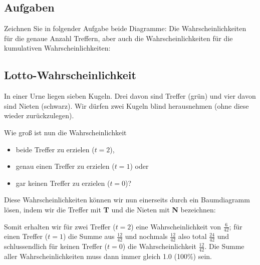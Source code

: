 \subsection*{Aufgaben}





Zeichnen Sie in folgender Aufgabe beide Diagramme: Die
Wahrscheinlichkeiten für die genaue Anzahl Treffern, aber auch die
Wahrscheinlichkeiten für die kumulativen Wahrscheinlichkeiten:


\newpage

\subsection{Lotto-Wahrscheinlichkeit}
In einer Urne liegen sieben Kugeln. Drei davon sind Treffer (grün) und vier davon sind Nieten (schwarz).
Wir dürfen zwei Kugeln blind herausnehmen (ohne diese wieder zurückzulegen).


Wie groß ist nun die Wahrscheinlichkeit
\begin{itemize}
\item beide Treffer zu erzielen ($t=2$),
\item genau einen Treffer zu erzielen ($t=1$) oder
\item gar keinen Treffer zu erzielen ($t=0$)?
\end{itemize}

Diese Wahrscheinlichkeiten können wir nun einerseits durch ein Baumdiagramm lösen, indem wir die Treffer mit \textbf{\color{ForestGreen}T} und die Nieten mit \textbf{\color{red}N} bezeichnen:


Somit erhalten wir für zwei Treffer ($t=2$) eine Wahrscheinlichkeit von $\frac{6}{42}$; für einen Treffer ($t=1$) die Summe aus $\frac{12}{42}$ und nochmals $\frac{12}{42}$ also total $\frac{24}{42}$ und schlussendlich für keinen Treffer ($t=0$) die Wahrscheinlichkeit $\frac{12}{42}$.
Die Summe aller Wahrscheinlichkeiten muss dann immer gleich 1.0 (100\%) sein.
\newpage

